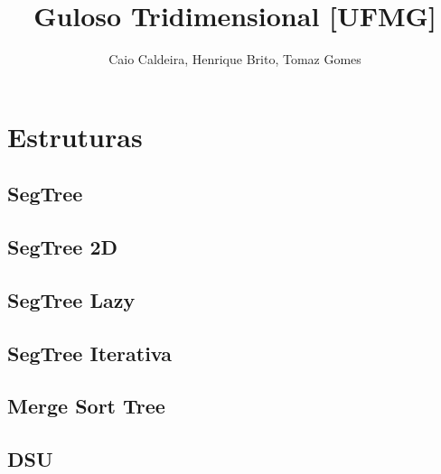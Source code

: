 \documentclass[12pt, a4paper, twoside]{article}
\title{Guloso Tridimensional [UFMG]}
\author{Caio Caldeira, Henrique Brito, Tomaz Gomes}
\begin{document}
\twocolumn
\date{} %
\maketitle


\renewcommand{\contentsname}{Índice} %
\tableofcontents





%
%

\newpage

\section{Estruturas}

\subsection{SegTree}


\newpage

\subsection{SegTree 2D}


\newpage

\subsection{SegTree Lazy}


\newpage

\subsection{SegTree Iterativa}


\newpage

\subsection{Merge Sort Tree}


\newpage

\subsection{DSU}

\end{document}
